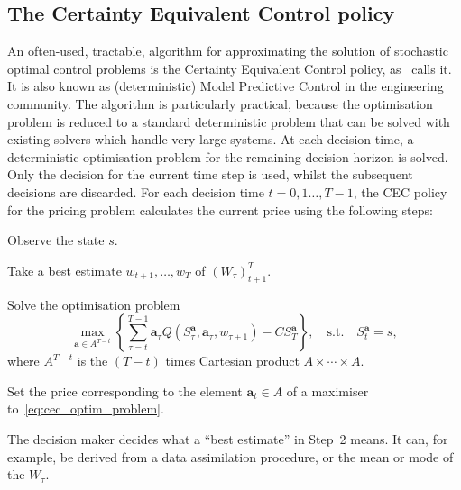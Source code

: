 \documentclass[main.tex]{subfiles}
\begin{document}
\subsection{The Certainty Equivalent Control policy}
An often-used, tractable, algorithm for approximating the solution of
stochastic optimal control
problems is the Certainty Equivalent Control policy,
as~\citet{bertsekas2005dynamic} calls it.
It is also known as (deterministic) Model
Predictive Control in the engineering community.
The algorithm is particularly practical, because the optimisation
problem is reduced to a standard deterministic problem that can
be solved with existing solvers which
handle very large systems.
At each decision time, a deterministic optimisation problem for the
remaining decision horizon is solved. Only the decision for the
current time step is
used, whilst the subsequent decisions are discarded.
For each decision time $t=0,1\dots,T-1$, the CEC policy for the pricing
problem calculates the current price using the following steps:
\begin{enumerate}
  \begin{samepage}
  \item Observe the state $s$.
  \item Take a best estimate $w_{t+1},\dots,w_T$ of ${(W_\tau)}_{t+1}^T$.
  \item Solve the optimisation problem
    \begin{equation}\label{eq:cec_optim_problem}
      \max_{\mathbf{a}\in A^{T-t}}\left\{\sum_{\tau=t}^{T-1}\mathbf{a}_\tau
         Q(S_\tau^{\mathbf{a}},\mathbf{a}_\tau
        ,w_{\tau+1})-CS_T^{\mathbf{a}}\right\},
      \quad \text{s.t.}\quad S_t^{\mathbf{a}}=s,
    \end{equation}
    where $A^{T-t}$ is the $(T-t)$ times Cartesian product $A\times
    \cdots\times A$.
  \item Set the price corresponding to the element
    $\mathbf{a}_t\in A$ of a maximiser to~\eqref{eq:cec_optim_problem}.
  \end{samepage}
\end{enumerate}
The decision maker decides what a ``best estimate'' in Step~2
means. It can, for example, be
derived from a data assimilation procedure, or the
mean or mode of the $W_\tau$.
\end{document}
